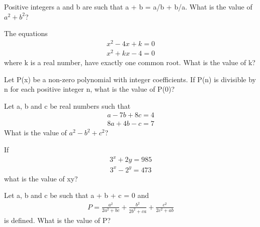 \item Positive integers a and b are such that a + b = a/b + b/a. What is the value of $a^2 + b^2$?

\item The equations 
\begin{align*}
x^2 - 4x + k = 0
\end{align*}
\begin{align*}
x^2 + kx - 4 = 0
\end{align*}
where k is a real number, have exactly one common root. What is the value of k?

\item Let P(x) be a non-zero polynomial with integer coefficients. If P(n) is divisible by n for each positive integer n, what is the value of P(0)?

\item Let a, b and c be real numbers such that 
\begin{align*}
a - 7b + 8c = 4 
\end{align*}
\begin{align*}
8a + 4b - c = 7
\end{align*}
What is the value of $a^2 - b^2 + c^2$?

\item If 
\begin{align*}
3^x + 2y =985
\end{align*}
\begin{align*}
3^x - 2^y = 473 
\end{align*}
what is the value of xy?

\item Let a, b and c be such that a + b + c = 0 and 
\begin{align*}
P = \frac{a^2}{2a^2 + bc} + \frac{b^2}{2b^2 + ca} + \frac{c^2}{2c^2 + ab}
\end{align*}
is defined. What is the value of P?

